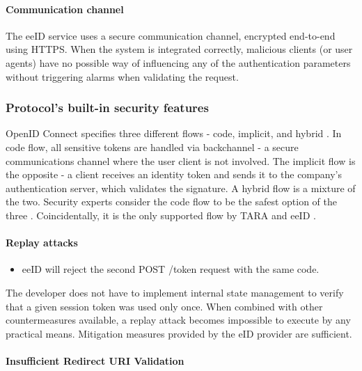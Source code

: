 \paragraph{Communication channel}

The eeID service uses a secure communication channel, encrypted end-to-end using HTTPS. When the system is integrated correctly, malicious clients (or user agents) have no possible way of influencing any of the authentication parameters without triggering alarms when validating the request.

\subsubsection{Protocol's built-in security features}

OpenID Connect specifies three different flows - code, implicit, and hybrid \cite{oidc}. In code flow, all sensitive tokens are handled via backchannel - a secure communications channel where the user client is not involved. The implicit flow is the opposite - a client receives an identity token and sends it to the company's authentication server, which validates the signature. A hybrid flow is a mixture of the two. Security experts consider the code flow to be the safest option of the three \cite{ietf-oauth-security-topics-19}. Coincidentally, it is the only supported flow by TARA and eeID \cite{tara-technical}.

\paragraph{Replay attacks}

\begin{itemize}
  \item eeID will reject the second POST /token request with the same code. 
\end{itemize}

The developer does not have to implement internal state management to verify that a given session token was used only once. When combined with other countermeasures available, a replay attack becomes impossible to execute by any practical means. Mitigation measures provided by the eID provider are sufficient.

\paragraph{Insufficient Redirect URI Validation}

